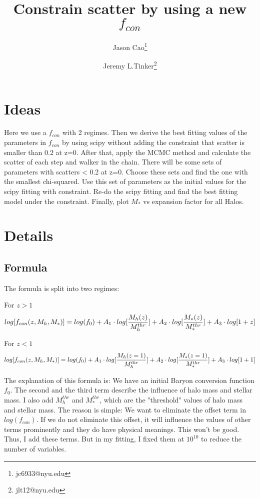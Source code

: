\documentclass[ajp]{article}   	%
\title{Constrain scatter by using a new $f_{con}$}
\author[1]{Jason Cao\thanks{jc6933@nyu.edu}}
\author[2]{Jeremy L.Tinker\thanks{jlt12@nyu.edu}}
\affil[1]{Department of Physics,  New York University}
\affil[2]{Center for Cosmology and Particle Physics, Department of Physics, New York University, New York, 10012 NY, USA}
\date{}							%
\begin{document}
\maketitle


\section{Ideas}

Here we use a $f_{con}$ with 2 regimes. Then we derive the best fitting values of the parameters in $f_{con}$ by using scipy without adding the constraint that scatter is smaller than 0.2 at z=0. After that, apply the MCMC method and calculate the scatter of each step and walker in the chain. There will be some sets of parameters with scatters < 0.2 at z=0. Choose these sets and find the one with the smallest chi-squared. Use this set of parameters as the initial values for the scipy fitting with constraint. Re-do the scipy fitting and find the best fitting model under the constraint. Finally, plot $M_*$ vs expansion factor for all Halos.

\section{Details}

\subsection{Formula}

The formula is split into two regimes: \cite{tinker2016testing}
\bigskip

For $z>1$
\begin{equation}
log[f_{con}(z,M_h, M_*)] = log(f_0) + A_1 \cdot log[{{M_h(z)} \over{M_h^{thr}}}]+ A_2 \cdot log[{{M_*(z)} \over{M_*^{thr}}}] + A_3 \cdot log[1+z]
\end{equation}
\bigskip

For $z<1$
\begin{equation}
log[f_{con}(z,M_h, M_*)] = log(f_0) + A_1 \cdot log[{{M_h(z=1)} \over{M_h^{thr}}}]+ A_2 \cdot log[{{M_*(z=1)} \over{M_*^{thr}}}] + A_3 \cdot log[1+1]
\end{equation}
\bigskip

The explanation of this formula is: We have an initial Baryon conversion function $f_0$. The second and the third term describe the influence of halo mass and stellar mass. I also add $M_h^{thr}$ and $M_*^{thr}$, which are the "threshold" values of halo mass and stellar mass. The reason is simple: We want to eliminate the offset term in $log(f_{con})$. If we do not eliminate this offset, it will influence the values of other terms prominently and they do have physical meanings. This won't be good. Thus, I add these terms.
But in my fitting, I fixed them at $10^{10}$ to reduce the number of variables. 
\end{document}
